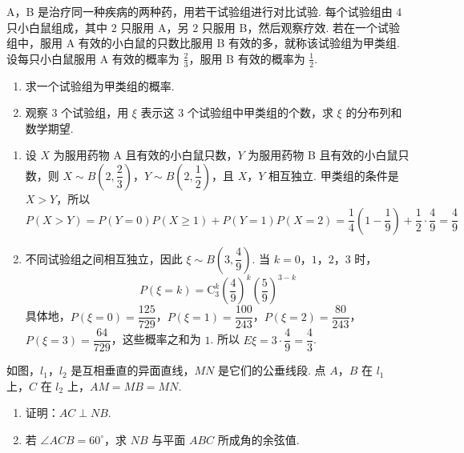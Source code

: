 \begin{problem}
A，B 是治疗同一种疾病的两种药，用若干试验组进行对比试验. 每个试验组由 \(4\) 只小白鼠组成，其中 \(2\) 只服用 A，另 \(2\) 只服用 B，然后观察疗效. 若在一个试验组中，服用 A 有效的小白鼠的只数比服用 B 有效的多，就称该试验组为甲类组. 设每只小白鼠服用 A 有效的概率为 \(\frac23\)，服用 B 有效的概率为 \(\frac12\).

\begin{enumerate}
\item 求一个试验组为甲类组的概率.
\item 观察 \(3\) 个试验组，用 \(\xi\) 表示这 \(3\) 个试验组中甲类组的个数，求 \(\xi\) 的分布列和数学期望.
\end{enumerate}
\end{problem}

\begin{solution}
\begin{enumerate}
\item 设 \(X\) 为服用药物 A 且有效的小白鼠只数，\(Y\) 为服用药物 B 且有效的小白鼠只数，则 \(X\sim B\left(2,\dfrac23\right)\)，\(Y\sim B\left(2,\dfrac12\right)\)，且 \(X\)，\(Y\) 相互独立. 甲类组的条件是 \(X>Y\)，所以
\[
P(X>Y)=P(Y=0)P(X\geq1)+P(Y=1)P(X=2)=\frac14\left(1-\frac19\right)+\frac12\cdot\frac49=\frac49
\]
\item 不同试验组之间相互独立，因此 \(\xi\sim B\left(3,\dfrac49\right)\). 当 \(k=0\)，\(1\)，\(2\)，\(3\) 时，
\[
P(\xi=k)=\mathrm C_3^k\left(\frac49\right)^k\left(\frac59\right)^{3-k}
\]
具体地，\(P(\xi=0)=\dfrac{125}{729}\)，\(P(\xi=1)=\dfrac{100}{243}\)，\(P(\xi=2)=\dfrac{80}{243}\)，\(P(\xi=3)=\dfrac{64}{729}\)，这些概率之和为 \(1\). 所以 \(E\xi=3\cdot\dfrac49=\dfrac43\).
\end{enumerate}
\end{solution}

\begin{problem}
如图，\(l_1\)，\(l_2\) 是互相垂直的异面直线，\(MN\) 是它们的公垂线段. 点 \(A\)，\(B\) 在 \(l_1\) 上，\(C\) 在 \(l_2\) 上，\(AM=MB=MN\).

\begin{enumerate}
\item 证明：\(AC\perp NB\).
\item 若 \(\angle ACB=60^{\circ}\)，求 \(NB\) 与平面 \(ABC\) 所成角的余弦值.
\end{enumerate}

\end{problem}

